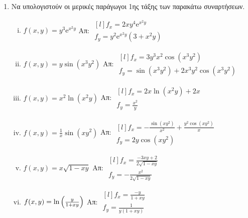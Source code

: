 \documentclass[a4paper,table]{report}
\begin{document}
\begin{center}
  \minibox{{\large\bfseries \textcolor{Col1}{Ασκήσεις στις Μερικές Παραγώγους}}}
\end{center}

\vspace{\baselineskip}

\begin{enumerate}
  \item Να υπολογιστούν οι μερικές παράγωγοι 1ης τάξης των παρακάτω συναρτήσεων.

    \begin{enumerate}[i)]
      \item $ f(x,y) = y^{3} \mathrm{e}^{x^{2}y} $ \hfill Απ: $ 
        \begin{matrix*}[l]
          f_{x} = 2xy^{4} \mathrm{e}^{x^{2}y} \\ 
          f_{y} = y^{2} \mathrm{e}^{x^{2}y} (3+x^{2}y) 
        \end{matrix*} $

      \item $ f(x,y) = y \sin{(x^{3}y^{2})} $ \hfill Απ: $ 
        \begin{matrix*}[l]
          f_{x} = 3y^{3}x^{2} \cos{(x^{3}y^{2})} \\[5pt]
          f_{y} = \sin{(x^{3}y^{2})} + 2x^{3}y^{2} \cos{(x^{3}y^{2})}
        \end{matrix*} $

      \item $ f(x,y) = x^{2} \ln{(x^{2}y)} $ \hfill Απ: $ 
        \begin{matrix*}[l]
          f_{x} = 2x \ln{(x^{2}y)} + 2x \\
          f_{y} = \frac{x^{2}}{y} 
        \end{matrix*} $

      \item $ f(x,y) = \frac{1}{x} \sin{(xy^{2})} $ \hfill Απ: $ 
        \begin{matrix*}[l]
          f_{x} = - \frac{\sin{(xy^{2})}}{x^{2}} + \frac{y^{2} \cos{(xy^{2})}}{x} 
          \\[5pt]
          f_{y} = 2y \cos{(xy^{2})}
        \end{matrix*} $

      \item $ f(x,y) = x \sqrt{1 - xy}$ \hfill Απ: $ 
        \begin{matrix*}[l]
          f_{x} = \frac{-3xy+2}{2 \sqrt{1-xy}} \\ 
          f_{y} = -\frac{x^{2}}{2 \sqrt{1-xy}} 
        \end{matrix*} $

      \item $ f(x,y) = \ln{\Bigl(\frac{y}{1+xy}\Bigr)} $ \hfill Απ: $ 
        \begin{matrix*}[l]
          f_{x} = \frac{-y}{1 + xy} \\ 
          f_{y} = \frac{1}{y(1 + xy)} 
        \end{matrix*} $
    \end{enumerate}
\end{enumerate}
\end{document}
